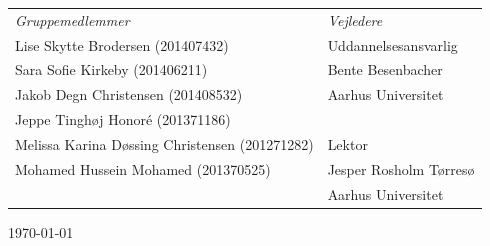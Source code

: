 \begin{titlingpage}
\begin{table}[h]
    \centering
    \begin{tabular}{p{8cm} p{5cm}}
        \textit{Gruppemedlemmer} & \textit{Vejledere} \\
        Lise Skytte Brodersen (201407432)	  & Uddannelsesansvarlig   \\
        Sara Sofie Kirkeby (201406211)   & Bente Besenbacher  \\
        Jakob Degn Christensen (201408532)  & Aarhus Universitet   \\
        Jeppe Tinghøj Honoré (201371186)   &   \\
        Melissa Karina Døssing Christensen (201271282) & Lektor\\
        Mohamed Hussein Mohamed (201370525)   & Jesper Rosholm Tørresø \\
        	&	Aarhus Universitet \\
    \end{tabular}
\end{table}



\vfill

\begin{center}
{\large \today}
\end{center}


\end{titlingpage}